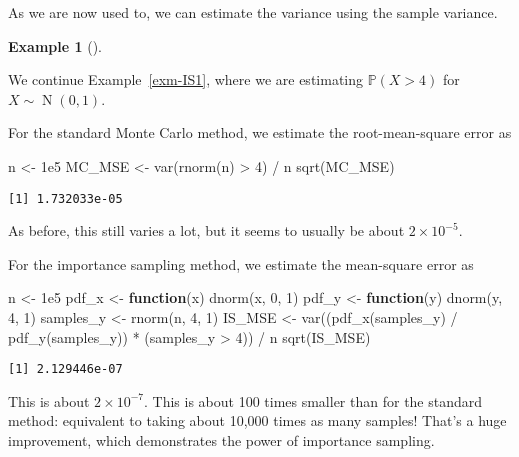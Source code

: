 \documentclass[
  letterpaper,
  DIV=11,
  numbers=noendperiod]{scrreprt}
\newenvironment{Shaded}{\begin{snugshade}}{\end{snugshade}}
\newcommand{\ControlFlowTok}[1]{\textcolor[rgb]{0.00,0.23,0.31}{\textbf{#1}}}
\newcommand{\DecValTok}[1]{\textcolor[rgb]{0.68,0.00,0.00}{#1}}
\newcommand{\FloatTok}[1]{\textcolor[rgb]{0.68,0.00,0.00}{#1}}
\newcommand{\FunctionTok}[1]{\textcolor[rgb]{0.28,0.35,0.67}{#1}}
\newcommand{\NormalTok}[1]{\textcolor[rgb]{0.00,0.23,0.31}{#1}}
\newcommand{\OtherTok}[1]{\textcolor[rgb]{0.00,0.23,0.31}{#1}}
\newcommand{\SpecialCharTok}[1]{\textcolor[rgb]{0.37,0.37,0.37}{#1}}
\theoremstyle{plain}
\theoremstyle{definition}
\theoremstyle{definition}
\newtheorem{example}{Example}[chapter]
\theoremstyle{remark}
\begin{document}
As we are now used to, we can estimate the variance using the sample
variance.

\begin{example}[]\protect\hypertarget{exm-IS2}{}\label{exm-IS2}

We continue Example~\ref{exm-IS1}, where we are estimating
\(\mathbb P(X > 4)\) for \(X \sim \operatorname{N}(0,1)\).

For the standard Monte Carlo method, we estimate the root-mean-square
error as

\begin{Shaded}
\begin{Highlighting}[]
\NormalTok{n }\OtherTok{\textless{}{-}} \FloatTok{1e5}
\NormalTok{MC\_MSE }\OtherTok{\textless{}{-}} \FunctionTok{var}\NormalTok{(}\FunctionTok{rnorm}\NormalTok{(n) }\SpecialCharTok{\textgreater{}} \DecValTok{4}\NormalTok{) }\SpecialCharTok{/}\NormalTok{ n}
\FunctionTok{sqrt}\NormalTok{(MC\_MSE)}
\end{Highlighting}
\end{Shaded}

\begin{verbatim}
[1] 1.732033e-05
\end{verbatim}

As before, this still varies a lot, but it seems to usually be about
\(2 \times 10^{-5}\).

For the importance sampling method, we estimate the mean-square error as

\begin{Shaded}
\begin{Highlighting}[]
\NormalTok{n }\OtherTok{\textless{}{-}} \FloatTok{1e5}
\NormalTok{pdf\_x }\OtherTok{\textless{}{-}} \ControlFlowTok{function}\NormalTok{(x) }\FunctionTok{dnorm}\NormalTok{(x, }\DecValTok{0}\NormalTok{, }\DecValTok{1}\NormalTok{)}
\NormalTok{pdf\_y }\OtherTok{\textless{}{-}} \ControlFlowTok{function}\NormalTok{(y) }\FunctionTok{dnorm}\NormalTok{(y, }\DecValTok{4}\NormalTok{, }\DecValTok{1}\NormalTok{)}
\NormalTok{samples\_y }\OtherTok{\textless{}{-}} \FunctionTok{rnorm}\NormalTok{(n, }\DecValTok{4}\NormalTok{, }\DecValTok{1}\NormalTok{)}
\NormalTok{IS\_MSE }\OtherTok{\textless{}{-}} \FunctionTok{var}\NormalTok{((}\FunctionTok{pdf\_x}\NormalTok{(samples\_y) }\SpecialCharTok{/} \FunctionTok{pdf\_y}\NormalTok{(samples\_y)) }\SpecialCharTok{*}\NormalTok{ (samples\_y }\SpecialCharTok{\textgreater{}} \DecValTok{4}\NormalTok{)) }\SpecialCharTok{/}\NormalTok{ n}
\FunctionTok{sqrt}\NormalTok{(IS\_MSE)}
\end{Highlighting}
\end{Shaded}

\begin{verbatim}
[1] 2.129446e-07
\end{verbatim}

This is about \(2 \times 10^{-7}\). This is about 100 times smaller than
for the standard method: equivalent to taking about 10,000 times as many
samples! That's a huge improvement, which demonstrates the power of
importance sampling.

\end{example}
\end{document}
